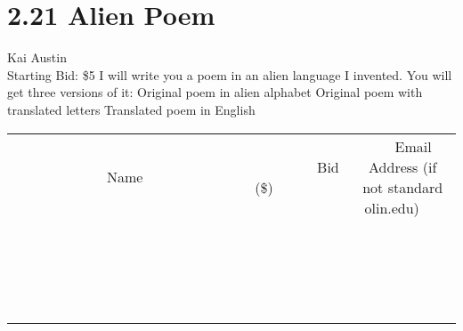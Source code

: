 \documentclass[11pt]{article}
\begin{document}
\section*{2.21 Alien Poem}
Kai Austin
\\
Starting Bid: \$5
\newline
I will write you a poem in an alien language I invented.
You will get three versions of it:
Original poem in alien alphabet
Original poem with translated letters
Translated poem in English
\\[3ex]
\begin{tabular}{c c c}
~~~~~~~~~~~~~Name~~~~~~~~~~~~~ & ~~~~~~~~~Bid (\$)~~~~~~~~~  & ~~~Email Address (if not standard olin.edu)~~~\\
 & & \\
\hline
 & & \\
\hline
 & & \\
\hline
 & & \\
\hline
 & & \\
\hline
 & & \\
\hline
 & & \\
\hline
 & & \\
\hline
 & & \\
\hline
 & & \\
\hline
 & & \\
\hline
 & & \\
\hline
 & & \\
\hline
 & & \\
\hline
 & & \\
\hline
 & & \\
\hline
 & & \\
\hline
 & & \\
\hline
 & & \\
\hline
\end{tabular}
\newpage
\end{document}
